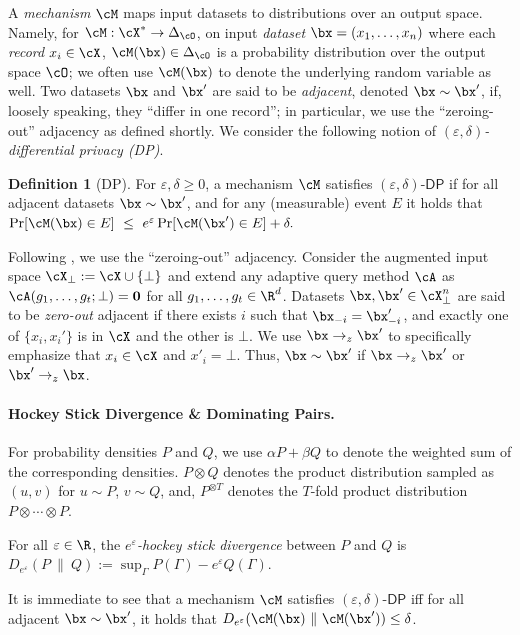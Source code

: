 \documentclass[twoside]{article}
\theoremstyle{definition}
\newtheorem{definition}[theorem]{Definition}
\newcommand{\eps}{\varepsilon}
\newcommand{\Deps}{D_{e^{\eps}}}
\newcommand{\DP}{\mathsf{DP}}
\newcommand{\event}{\Gamma}
\begin{document}
A {\em mechanism} $\cM$ maps input datasets to distributions over an output space.  Namely, for $\cM : \cX^* \to \Delta_{\cO}$, on input {\em dataset} $\bx = (x_1, \ldots, x_n)$ where each {\em record} $x_i \in \cX$, $\cM(\bx) \in \Delta_{\cO}$ is a probability distribution over the output space $\cO$; we often use $\cM(\bx)$ to denote the underlying random variable as well.
Two datasets $\bx$ and $\bx'$ are said to be {\em adjacent}, denoted $\bx \sim \bx'$, if, loosely speaking, they ``differ in one record''; in particular, we use the ``zeroing-out'' adjacency as defined shortly. We consider the following notion of \emph{$(\eps, \delta)$-differential privacy (DP)}.
\begin{definition}[DP]\label{def:dp}
For $\eps, \delta \ge 0$, a mechanism $\cM$ satisfies $(\eps, \delta)$-$\DP$ if for all adjacent datasets $\bx \sim \bx'$, and for any (measurable) event $E$ it holds that
$
\Pr[\cM(\bx) \in E] ~\le~ e^{\eps} \Pr[\cM(\bx') \in E] + \delta.
$
\end{definition}
Following \cite{kairouz21practical,chua24private}, we use the ``zeroing-out'' adjacency. Consider the augmented input space $\cX_{\bot} := \cX \cup \{\bot\}$ and extend any adaptive query method $\cA$ as $\cA(g_1, \ldots, g_t; \bot) = \mathbf{0}$ for all $g_1, \ldots, g_t \in \R^d$. Datasets $\bx, \bx' \in \cX_{\bot}^n$ are said to be {\em zero-out} adjacent if there exists $i$ such that $\bx_{-i} = \bx'_{-i}$, and exactly one of $\{x_i, x_i'\}$ is in $\cX$ and the other is $\bot$. We use $\bx \to_z \bx'$ to specifically emphasize that $x_i \in \cX$ and $x'_i = \bot$. Thus, $\bx \sim \bx'$ if $\bx \to_z \bx'$ or $\bx' \to_z \bx$.

\paragraph{Hockey Stick Divergence \& Dominating Pairs.}%
For probability densities $P$ and $Q$, we use $\alpha P + \beta Q$ to denote the weighted sum of the corresponding densities.
$P \otimes Q$ denotes the product distribution sampled as $(u, v)$ for $u \sim P$, $v \sim Q$, and, $P^{\otimes T}$ denotes the $T$-fold product distribution $P \otimes \cdots \otimes P$.

For all $\eps \in \R$, the {\em $e^\eps$-hockey stick divergence} between $P$ and $Q$ is
$\Deps(P ~\|~ Q) := \sup_{\event} P(\event) - e^{\eps} Q(\event)$.

It is immediate to see that a mechanism $\cM$ satisfies $(\eps, \delta)$-$\DP$ iff for all adjacent $\bx \sim \bx'$, it holds that $\Deps(\cM(\bx) ~\|~ \cM(\bx')) \le \delta$.
\end{document}

